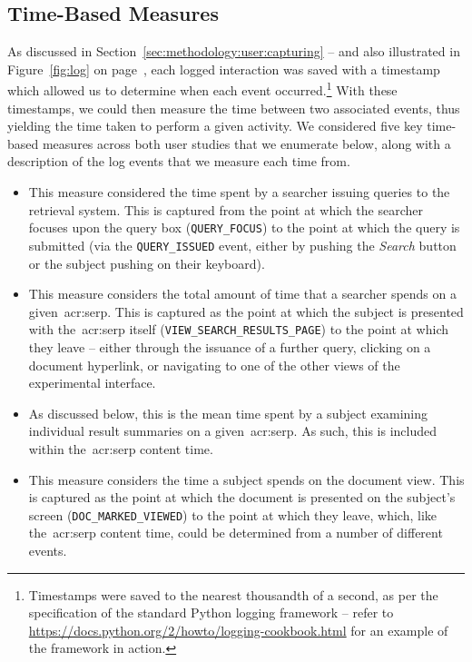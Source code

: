 
\subsection{Time-Based Measures}\label{sec:methodology:extracting:time}
As discussed in Section~\ref{sec:methodology:user:capturing} -- and also illustrated in Figure~\ref{fig:log} on page~\pageref{fig:log}, each logged interaction was saved with a timestamp which allowed us to determine when each event occurred.\footnote{Timestamps were saved to the nearest thousandth of a second, as per the specification of the standard Python logging framework -- refer to \url{https://docs.python.org/2/howto/logging-cookbook.html}  for an example of the framework in action.} With these timestamps, we could then measure the time between two associated events, thus yielding the time taken to perform a given activity. We considered five key time-based measures across both user studies that we enumerate below, along with a description of the log events that we measure each time from.

\begin{itemize}
    \item{ This measure considered the time spent by a searcher issuing queries to the retrieval system. This is captured from the point at which the searcher focuses upon the query box (\texttt{QUERY\_FOCUS}) to the point at which the query is submitted (via the \texttt{QUERY\_ISSUED} event, either by pushing the \emph{Search} button or the subject pushing \Return on their keyboard).}
    \item{ This measure considers the total amount of time that a searcher spends on a given~\gls{acr:serp}. This is captured as the point at which the subject is presented with the~\gls{acr:serp} itself (\texttt{VIEW\_SEARCH\_RESULTS\_PAGE}) to the point at which they leave -- either through the issuance of a further query, clicking on a document hyperlink, or navigating to one of the other views of the experimental interface.}
    \item{ As discussed below, this is the mean time spent by a subject examining individual result summaries on a given~\gls{acr:serp}. As such, this is included within the~\gls{acr:serp} content time.}
    \item{ This measure considers the time a subject spends on the document view. This is captured as the point at which the document is presented on the subject's screen (\texttt{DOC\_MARKED\_VIEWED}) to the point at which they leave, which, like the~\gls{acr:serp} content time, could be determined from a number of different events.}
\end{itemize}

